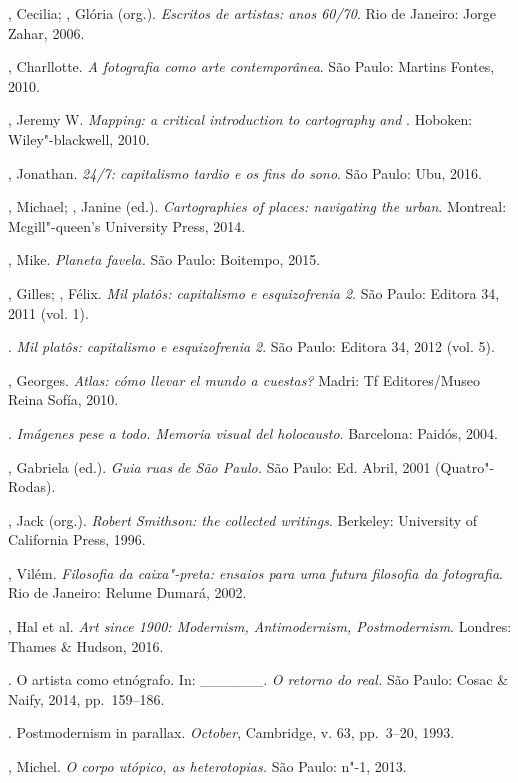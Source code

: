 \begin{bibliohedra}
, Cecilia; , Glória (org.). \emph{Escritos de artistas:
anos 60/70}. Rio de Janeiro: Jorge Zahar, 2006.

, Charllotte. \emph{A fotografia como arte contemporânea}. São
Paulo: Martins Fontes, 2010.

, Jeremy W. \emph{Mapping: a critical introduction to
cartography and} . Hoboken: Wiley"-blackwell, 2010.

, Jonathan. \emph{24/7: capitalismo tardio e os fins do sono}.
São Paulo: Ubu, 2016.

, Michael; , Janine (ed.). \emph{Cartographies of
places: navigating the urban}. Montreal: Mcgill"-queen's University
Press, 2014.

, Mike. \emph{Planeta favela.} São Paulo: Boitempo, 2015.

, Gilles; , Félix. \emph{Mil platôs: capitalismo e
esquizofrenia 2}. São Paulo: Editora 34, 2011 (vol. 1).

\tit{\_\_\_\_\_\_}. \emph{Mil platôs: capitalismo e esquizofrenia 2}.
São Paulo: Editora 34, 2012 (vol. 5).

, Georges. \emph{Atlas: cómo llevar el mundo a cuestas?}
Madri: Tf Editores/Museo Reina Sofía, 2010.

\tit{\_\_\_\_\_\_}. \emph{Imágenes pese a todo. Memoria visual del holocausto}. Barcelona: Paidós, 2004.

, Gabriela (ed.). \emph{Guia ruas de São Paulo.} São Paulo: Ed.
Abril, 2001 (Quatro"-Rodas).

, Jack (org.). \emph{Robert Smithson: the collected writings}.
Berkeley: University of California Press, 1996.

, Vilém. \emph{Filosofia da caixa"-preta: ensaios para uma
futura filosofia da fotografia}. Rio de Janeiro: Relume Dumará, 2002.

, Hal et al. \emph{Art since 1900: Modernism, Antimodernism,
Postmodernism}. Londres: Thames \& Hudson, 2016.

\tit{\_\_\_\_\_\_}. O artista como etnógrafo. In: \_\_\_\_\_\_.
\emph{O retorno do real.} São Paulo: Cosac \& Naify, 2014, pp.~159--186.

\tit{\_\_\_\_\_\_}. Postmodernism in parallax. \emph{October},
Cambridge, v. 63, pp.~3--20, 1993.

, Michel. \emph{O corpo utópico, as heterotopias.} São Paulo:
n"-1, 2013.


\end{bibliohedra}
